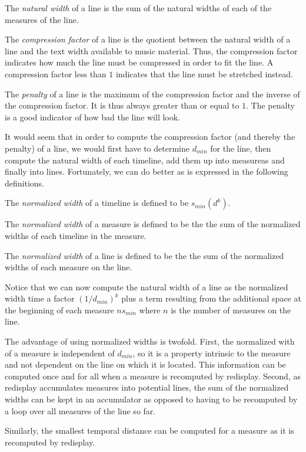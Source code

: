 \documentclass{article}
\begin{document}
The \emph{natural width} of a line is the sum of the natural widths of
each of the measures of the line.

The \emph{compression factor} of a line is the quotient between the
natural width of a line and the text width available to music
material.  Thus, the compression factor indicates how much the line
must be compressed in order to fit the line.  A compression factor
less than $1$ indicates that the line must be stretched instead. 

The \emph{penalty} of a line is the maximum of the compression factor
and the inverse of the compression factor.  It is thus always greater
than or equal to $1$.   The penalty is a good indicator of how bad the
line will look. 

It would seem that in order to compute the compression factor (and
thereby the penalty) of a line, we would first have to determine
$d_{min}$ for the line, then compute the natural width of each
timeline, add them up into measureas and finally into lines.
Fortunately, we can do better as is expressed in the following
definitions. 

The \emph{normalized width} of a timeline is defined to be $s_{min} (d
^ k)$.

The \emph{normalized width} of a measure is defined to be the the sum of
the normalized widths of each timeline in the measure.

The \emph{normalized width} of a line is defined to be the the sum of
the normalized widths of each measure on the line.

Notice that we can now compute the natural width of a line as the
normalized width time a factor $(1/d_{min})^k$ plus a term resulting
from the additional space at the beginning of each measure $n s_{min}$
where $n$ is the number of measures on the line. 

The advantage of using normalized widths is twofold.  First, the
normalized with of a measure is independent of $d_{min}$, so it is a
property intrinsic to the measure and not dependent on the line on
which it is located.  This information can be computed once and for
all when a measure is recomputed by redisplay.  Second, as redisplay
accumulates measures into potential lines, the sum of the normalized
widths can be kept in an accumulator as opposed to having to be
recomputed by a loop over all measures of the line so far.  

Similarly, the smallest temporal distance can be computed for a
measure as it is recomputed by redisplay.  
\end{document}
